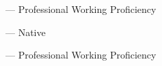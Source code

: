 \begin{zitemize}
\item {} --- Professional Working Proficiency
\item {} --- Native
\item {} --- Professional Working Proficiency
\end{zitemize}